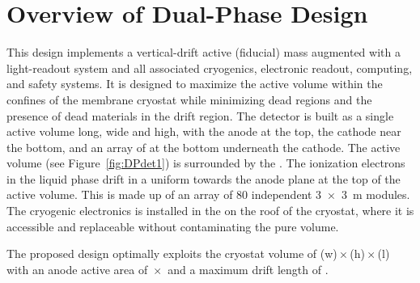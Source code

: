 

\section{Overview of Dual-Phase Design}
\label{sec:dp-execsum-description}

This  design implements a vertical-drift \dpactivelarmass{} active  (\dpfidlarmass fiducial) mass  augmented with a light-readout system  %
and all associated cryogenics, electronic readout, computing, and safety systems. It is designed to maximize the active volume within the confines of the membrane cryostat while minimizing dead regions and the presence of dead materials in the drift region. The detector is built as a single active volume \dptpclen long, \dptpcwdth wide and \tpcheight high, with the anode at the top, the cathode near the bottom, and an array of  at the bottom underneath the cathode. The active volume (see Figure~\ref{fig:DPdet1}) is surrounded by the . The ionization electrons in the liquid phase drift  in a uniform \efield towards the anode plane at 
the top of the active volume. This is made up of an array of \num{80} independent \SI{3x3}{m}  modules. %
The cryogenic  electronics is  installed in the  on the roof of the cryostat, where %
it is accessible and replaceable without contaminating the pure  volume. 

The proposed design optimally exploits the cryostat volume of \cryostatwdth{}(w)\,$\times$\,\cryostatht{}(h)\,$\times$\,\cryostatlen{}(l) with an anode active area of \dptpcwdth{}\,$\times$\,\cryostatlen{} and a maximum drift length of \dpmaxdrift{}. %

